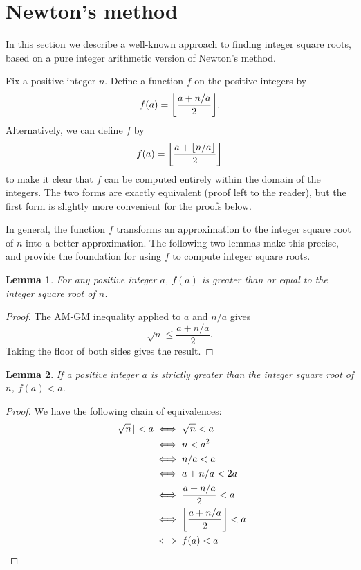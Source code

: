 \documentclass[a4paper]{article}
\DeclarePairedDelimiter\floor{\lfloor}{\rfloor}
\theoremstyle{plain}
\newtheorem{lemma}{Lemma}
\theoremstyle{definition}
\begin{document}


\section{Newton's method}

In this section we describe a well-known approach to finding integer square
roots, based on a pure integer arithmetic version of Newton's method.

Fix a positive integer $n$. Define a function $f$ on the positive integers
by
$$f(a) = \floor*{\frac{a + n/a}2}.$$
Alternatively, we can define $f$ by
$$f(a) = \floor*{\frac{a + \floor{n/a}}2}$$
to make it clear that $f$ can be computed entirely within the domain of the
integers. The two forms are exactly equivalent (proof left to the reader), but
the first form is slightly more convenient for the proofs below.

In general, the function $f$ transforms an approximation to the integer square
root of $n$ into a better approximation. The following two lemmas make this
precise, and provide the foundation for using $f$ to compute integer square
roots.

\begin{lemma}
  For any positive integer $a$, $f(a)$ is greater than or equal to the
  integer square root of $n$.
\end{lemma}

\begin{proof}
  The AM-GM inequality applied to $a$ and $n/a$ gives
  $$\sqrt n \le \frac{a + n/a}2.$$
  Taking the floor of both sides gives the result.
\end{proof}

\begin{lemma}
  If a positive integer $a$ is strictly greater than the integer square
  root of $n$, $f(a) < a$.
\end{lemma}

\begin{proof}
  We have the following chain of equivalences:
  \begin{align}
    \floor{\sqrt n} < a &\iff \sqrt n < a \\
                        &\iff n < a^2 \\
                        &\iff n/a < a \\
                        &\iff a + n/a < 2a \\
                        &\iff \frac{a + n/a}2 < a \\
                        &\iff \floor*{\frac{a + n/a}2} < a \\
                        &\iff f(a) < a
  \end{align}
\end{proof}
\end{document}
